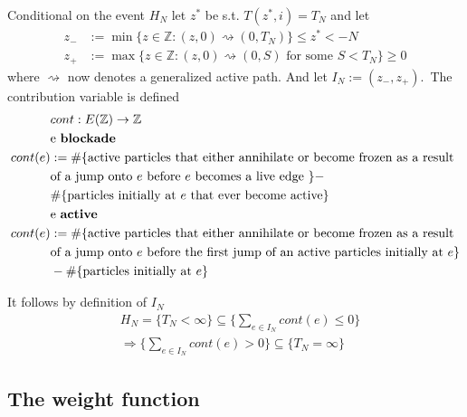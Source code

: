 \documentclass[
paper=128mm:96mm, %
fontsize=11pt, %
pagesize, %
parskip=half-, %
]{scrartcl} %
\theoremstyle{mythmstyle} %
\begin{document}
Conditional on the event $H_N$ let $z^*$ be s.t. $T(z^*,i)=T_N$ and let 
\begin{equation}
\begin{split}
z_- & := \min \{ z \in \mathbb{Z}: (z,0) \rightsquigarrow (0,T_N) \} \leq z^* < -N \\
z_+ & := \max \{ z \in \mathbb{Z}: (z,0) \rightsquigarrow (0,S) \text{ for some } S<T_N \} \geq 0
\end{split}
\end{equation}
where $\rightsquigarrow$ now denotes a generalized active path. And let $I_N:= (z_-, z_+)$.\
The contribution variable is defined
\begin{equation}
\begin{split}
&cont: E(\mathbb{Z}) \rightarrow \mathbb{Z}\\
&\text{e \textbf{blockade}}\\
cont(e)&:= \#\{\text{active particles that either annihilate or become frozen as a result} \\
 & \text{of a jump onto $e$ before $e$ becomes a live edge } \} -  \\
 & \#\{ \text{particles initially at $e$ that ever become active} \} \\
&\text{e \textbf{active}}\\
cont(e)&:= \#\{\text{active particles that either annihilate or become frozen as a result} \\
 & \text{of a jump onto $e$ before the first jump of an active particles initially at $e$} \}   \\
 & - \#\{\text{particles initially at $e$} \}
\end{split}
\end{equation}

It follows by definition of $I_N$
\begin{equation}
\begin{split}
& H_N = \{T_N < \infty \} \subseteq \{ \underset{e \in I_N}{\sum}cont(e) \leq 0 \} \\
& \Rightarrow \{ \underset{e \in I_N}{\sum}cont(e) > 0  \} \subseteq \{ T_N= \infty \}
\end{split}
\end{equation}
\clearpage

\subsection{The weight function}
\end{document}
